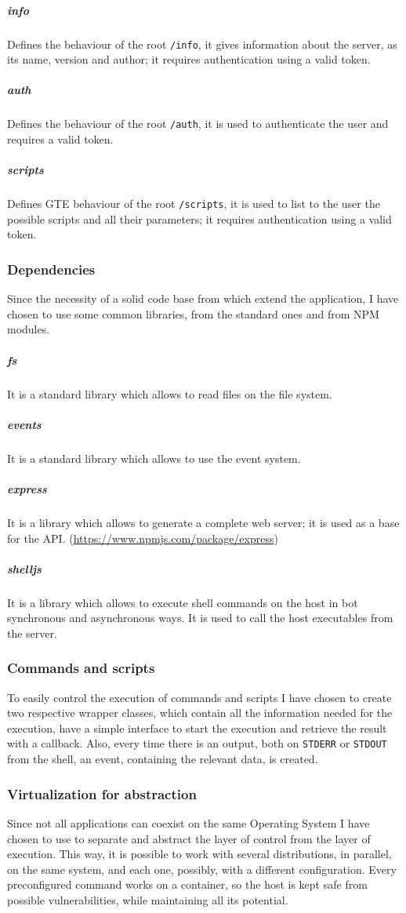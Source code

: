 \documentclass[../PiTest.tex]{subfiles}
\begin{document}
    \subparagraph{info}
    Defines the behaviour of the root \texttt{/info}, it gives information about the server, as its name, version and author; it requires authentication using a valid token.

    \subparagraph{auth}
    Defines the behaviour of the root \texttt{/auth}, it is used to authenticate the user and requires a valid token.

    \subparagraph{scripts}
    Defines GTE behaviour of the root \texttt{/scripts}, it is used to list to the user the possible scripts and all their parameters; it requires authentication using a valid token.

    \subsubsection{Dependencies}
    Since the necessity of a solid code base from which extend the application, I have chosen to use some common libraries, from the standard \nodejs ones and from NPM modules.

    \subparagraph{fs}
    It is a \nodejs standard library which allows to read files on the file system.

    \subparagraph{events}
    It is a \nodejs standard library which allows to use the event system.

    \subparagraph{express}
    It is a \npm library which allows to generate a complete web server; it is used as a base for the \REST API. (\url{https://www.npmjs.com/package/express})

    \subparagraph{shelljs}
    It is a \npm library which allows to execute shell commands on the host in bot synchronous and asynchronous ways. It is used to call the host executables from the server.
    

    \subsubsection{Commands and scripts}
    To easily control the execution of commands and scripts I have chosen to create two respective wrapper classes, which contain all the information needed for the execution, have a simple interface to start the execution and retrieve the result with a callback. Also, every time there is an output, both on \texttt{STDERR} or \texttt{STDOUT} from the shell, an event, containing the relevant data, is created.

    \subsubsection{Virtualization for abstraction}
    Since not all applications can coexist on the same Operating System I have chosen to use \docker to separate and abstract the layer of control from the layer of execution. This way, it is possible to work with several distributions, in parallel, on the same system, and each one, possibly, with a different configuration.
    Every preconfigured command works on a \docker container, so the host is kept safe from possible vulnerabilities, while maintaining all its potential.
\end{document}
